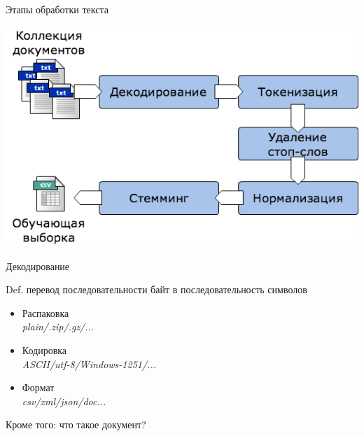 \documentclass[10pt,a4paper]{beamer}
\begin{document}

\begin{frame}{Этапы обработки текста}

\begin{center}
\includegraphics[scale=0.5]{images/textm.png}
\end{center}

\end{frame}


\begin{frame}{Декодирование}

\begin{block}{Def.}
перевод последовательности байт в последовательность символов
\end{block}

\begin{itemize}
\item Распаковка \\
{\it plain/.zip/.gz/...}
\item Кодировка \\
{\it ASCII/utf-8/Windows-1251/...}
\item Формат \\
{\it csv/xml/json/doc...}
\end{itemize}

Кроме того: что такое документ?

\end{frame}

\end{document}

